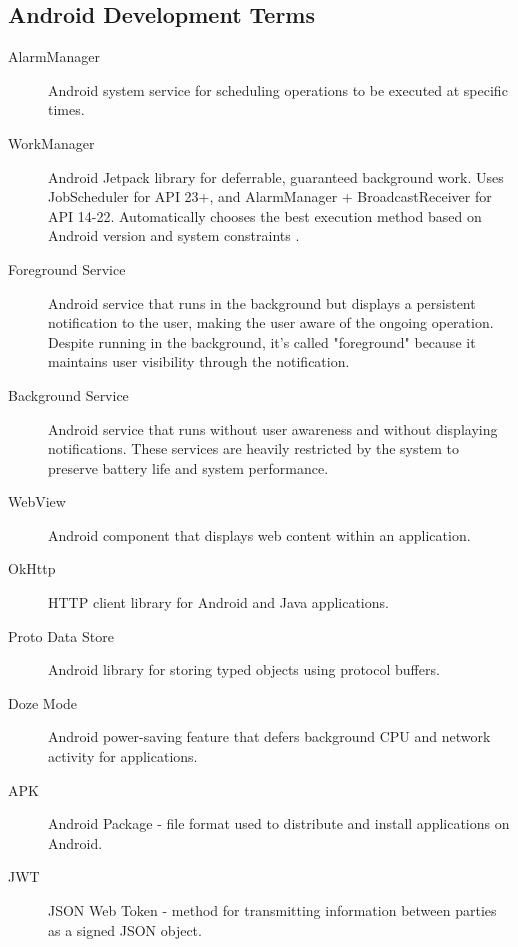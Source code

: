 \subsection{Android Development Terms}

\begin{description}
    \item[AlarmManager] Android system service for scheduling operations to be executed at specific times.
    
    \item[WorkManager] Android Jetpack library for deferrable, guaranteed background work. Uses JobScheduler for API 23+, and AlarmManager + BroadcastReceiver for API 14-22. Automatically chooses the best execution method based on Android version and system constraints \cite{android-workmanager}.
    
    \item[Foreground Service] Android service that runs in the background but displays a persistent notification to the user, making the user aware of the ongoing operation. Despite running in the background, it's called "foreground" because it maintains user visibility through the notification.
    
    \item[Background Service] Android service that runs without user awareness and without displaying notifications. These services are heavily restricted by the system to preserve battery life and system performance.
    
    \item[WebView] Android component that displays web content within an application.
    
    \item[OkHttp] HTTP client library for Android and Java applications.
    
    \item[Proto Data Store] Android library for storing typed objects using protocol buffers.
    
    \item[Doze Mode] Android power-saving feature that defers background CPU and network activity for applications.
    
    \item[APK] Android Package - file format used to distribute and install applications on Android.
    
    \item[JWT] JSON Web Token - method for transmitting information between parties as a signed JSON object.
\end{description}
